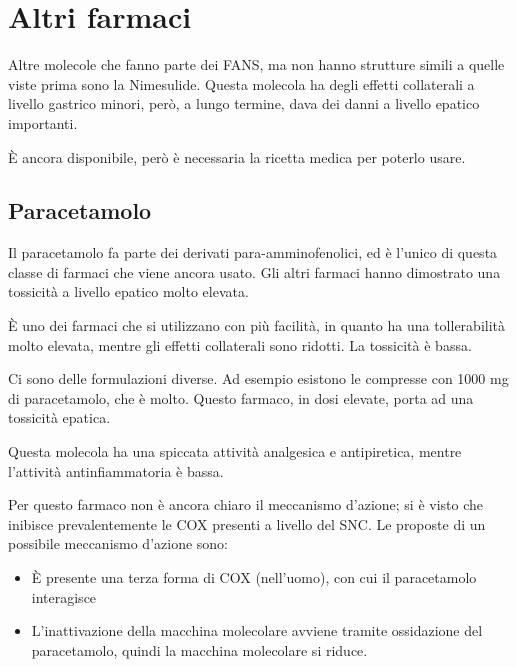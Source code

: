 
\clearpage

\section{Altri farmaci}

Altre molecole che fanno parte dei FANS, ma non hanno strutture simili a
quelle viste prima sono la Nimesulide. Questa molecola ha degli effetti
collaterali a livello gastrico minori, però, a lungo termine, dava dei
danni a livello epatico importanti.


È ancora disponibile, però è necessaria la ricetta medica per poterlo
usare.

\subsection{Paracetamolo}

Il paracetamolo fa parte dei derivati para-amminofenolici, ed è l'unico
di questa classe di farmaci che viene ancora usato. Gli altri farmaci
hanno dimostrato una tossicità a livello epatico molto elevata.


È uno dei farmaci che si utilizzano con più facilità, in quanto ha una
tollerabilità molto elevata, mentre gli effetti collaterali sono
ridotti. La tossicità è bassa.

Ci sono delle formulazioni diverse. Ad esempio esistono le compresse con
1000 mg di paracetamolo, che è molto. Questo farmaco, in dosi elevate,
porta ad una tossicità epatica.

Questa molecola ha una spiccata attività analgesica e antipiretica,
mentre l'attività antinfiammatoria è bassa.

Per questo farmaco non è ancora chiaro il meccanismo d'azione; si è
visto che inibisce prevalentemente le COX presenti a livello del SNC. Le
proposte di un possibile meccanismo d'azione sono:

\begin{itemize}
\item
È presente una terza forma di COX (nell'uomo), con cui il paracetamolo
interagisce
\item
L'inattivazione della macchina molecolare avviene tramite ossidazione
del paracetamolo, quindi la macchina molecolare si riduce.
\end{itemize}

